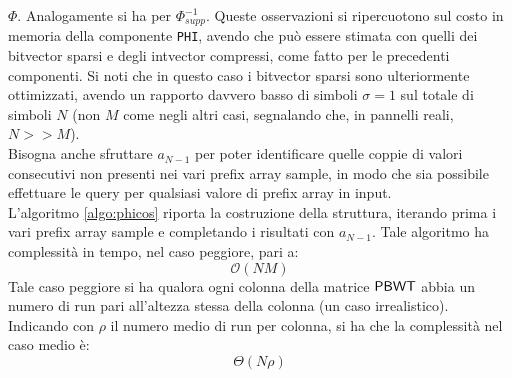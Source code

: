 $\varPhi$. Analogamente 
si ha per $\varPhi^{-1}_{supp}$.
Queste osservazioni si ripercuotono sul costo in memoria della componente
\texttt{PHI}, avendo che può essere stimata con quelli dei bitvector
sparsi e degli intvector compressi, come fatto per le precedenti componenti. Si
noti che in questo caso i bitvector sparsi sono ulteriormente
ottimizzati,
avendo un rapporto davvero basso di simboli $\sigma=1$ sul totale di
simboli $N$ (non $M$
come negli altri casi, segnalando che, in pannelli reali, $N>>M$).\\ 
Bisogna anche sfruttare $a_{N-1}$ per poter
identificare quelle coppie di valori consecutivi non presenti nei vari
prefix array sample, in modo che sia possibile effettuare le query per
qualsiasi valore di prefix array in input.\\
L'algoritmo \ref{algo:phicos} riporta la costruzione della struttura,
iterando prima i vari prefix array sample e completando i
risultati con $a_{N-1}$. Tale algoritmo ha complessità in tempo, nel caso
peggiore, pari a:
\begin{equation}
  \label{eq:phicos}
  \mathcal{O}(\mathit{NM})
\end{equation}
Tale caso peggiore si ha qualora ogni colonna della matrice $\mbox{\rm {\sf PBWT}}$ abbia un
numero di 
run pari all'altezza stessa della colonna (un caso irrealistico). Indicando con
$\rho$ il numero medio 
di run per colonna, si ha che la complessità nel caso medio è:
\begin{equation}
  \label{eq:phicos2}
  \varTheta(N\rho)
\end{equation}
